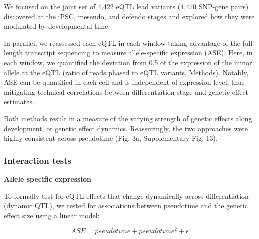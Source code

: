 We focused on the joint set of 4,422 eQTL lead variants (4,470 SNP-gene pairs) discovered at the iPSC, mesendo, and defendo stages and explored how they were modulated by developmental time.

In parallel, we reassessed each eQTL in each window taking advantage of the full length transcript sequencing to measure allele-specific expression (ASE).
Here, in each window, we quantified the deviation from 0.5 of the expression of the minor allele at the eQTL (ratio of reads phased to eQTL variants, Methods). 
Notably, ASE can be quantified in each cell and is independent of expression level, thus mitigating technical correlations between differentiation stage and genetic effect estimates.

Both methods result in a measure of the varying strength of genetic effects along development, or genetic effect dynamics. 
Reassuringly, the two approaches were highly consistent across pseudotime (Fig. 3a, Supplementary Fig. 13).\\

\subsubsection{Interaction tests}

\textbf{Allele specific expression}

To formally test for eQTL effects that change dynamically across differentiation (dynamic QTL), we tested for associations between pseudotime and the genetic effect size using a linear model:

\begin{equation}
    ASE = pseudotime + pseudotime^2 + \epsilon
\end{equation}

